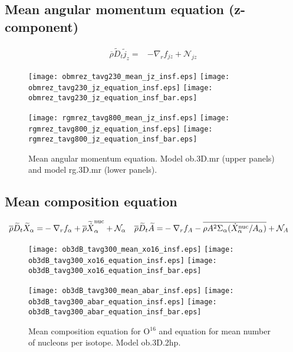 \documentclass[10pt,paper=a4]{report}
\newcommand{\eht}{\overline}
\newcommand{\fav}{\widetilde}
\newcommand{\av}{\overline}
\def\erho{\eht{\rho}}
\begin{document}
\newpage

\subsection{Mean angular momentum equation (z-component)}

\begin{align}
\erho\fav{D}_t \fav{j}_z = & -\nabla_r f_{jz} + {\mathcal N_{jz}}
\end{align}

\begin{figure}[!h]
\centerline{
\texttt{[image: obmrez\_tavg230\_mean\_jz\_insf.eps]}
\texttt{[image: obmrez\_tavg230\_jz\_equation\_insf.eps]}
\texttt{[image: obmrez\_tavg230\_jz\_equation\_insf\_bar.eps]}}

\centerline{
\texttt{[image: rgmrez\_tavg800\_mean\_jz\_insf.eps]}                      
\texttt{[image: rgmrez\_tavg800\_jz\_equation\_insf.eps]}     
\texttt{[image: rgmrez\_tavg800\_jz\_equation\_insf\_bar.eps]}}
\caption{Mean angular momentum equation. Model {\sf ob.3D.mr} (upper panels) and model {\sf rg.3D.mr} (lower panels). \label{fig:jz-equation}}
\end{figure}

\newpage

\subsection{Mean composition equation}

\begin{align}
\erho\fav{D}_t \fav{X}_\alpha = & -\nabla_r f_\alpha + \av{\rho}\fav{\dot{X}}_\alpha^{\rm nuc} + {\mathcal N_\alpha} & \erho\fav{D}_t \fav{A} = & -\nabla_r f_A - \av{\rho A^2\Sigma_\alpha (\dot{X}_\alpha^{\rm nuc} / A_\alpha)} + {\mathcal N_A}  \label{eq:rans_abar}
\end{align}

\begin{figure}[!h]
\centerline{
\texttt{[image: ob3dB\_tavg300\_mean\_xo16\_insf.eps]}
\texttt{[image: ob3dB\_tavg300\_xo16\_equation\_insf.eps]}
\texttt{[image: ob3dB\_tavg300\_xo16\_equation\_insf\_bar.eps]}}

\centerline{
\texttt{[image: ob3dB\_tavg300\_mean\_abar\_insf.eps]}
\texttt{[image: ob3dB\_tavg300\_abar\_equation\_insf.eps]}
\texttt{[image: ob3dB\_tavg300\_abar\_equation\_insf\_bar.eps]}}
\caption{Mean composition equation for O$^{16}$ and equation for mean number of nucleons per isotope. Model {\sf ob.3D.2hp}. \label{fig:alpha-abar-equation}}
\end{figure}
\end{document}
